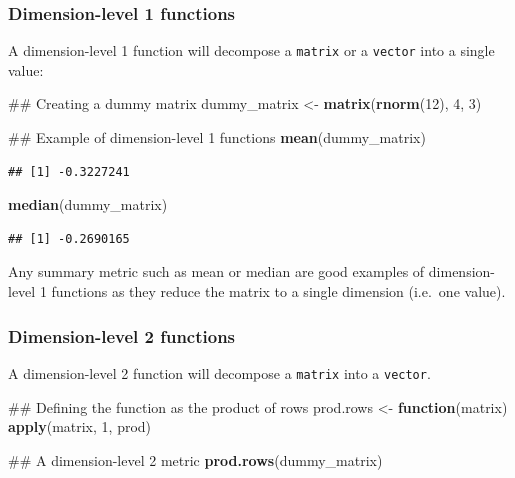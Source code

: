 \documentclass[]{book}
\newenvironment{Shaded}{\begin{snugshade}}{\end{snugshade}}
\newcommand{\KeywordTok}[1]{\textcolor[rgb]{0.13,0.29,0.53}{\textbf{#1}}}
\newcommand{\DecValTok}[1]{\textcolor[rgb]{0.00,0.00,0.81}{#1}}
\newcommand{\StringTok}[1]{\textcolor[rgb]{0.31,0.60,0.02}{#1}}
\newcommand{\ControlFlowTok}[1]{\textcolor[rgb]{0.13,0.29,0.53}{\textbf{#1}}}
\newcommand{\NormalTok}[1]{#1}
\theoremstyle{definition}
\theoremstyle{definition}
\theoremstyle{remark}
\begin{document}
\subsubsection{Dimension-level 1
functions}\label{dimension-level-1-functions}

A dimension-level 1 function will decompose a \texttt{matrix} or a
\texttt{vector} into a single value:

\begin{Shaded}
\begin{Highlighting}[]
\NormalTok{## Creating a dummy matrix}
\NormalTok{dummy_matrix <-}\StringTok{ }\KeywordTok{matrix}\NormalTok{(}\KeywordTok{rnorm}\NormalTok{(}\DecValTok{12}\NormalTok{), }\DecValTok{4}\NormalTok{, }\DecValTok{3}\NormalTok{)}

\NormalTok{## Example of dimension-level 1 functions}
\KeywordTok{mean}\NormalTok{(dummy_matrix)}
\end{Highlighting}
\end{Shaded}

\begin{verbatim}
## [1] -0.3227241
\end{verbatim}

\begin{Shaded}
\begin{Highlighting}[]
\KeywordTok{median}\NormalTok{(dummy_matrix)}
\end{Highlighting}
\end{Shaded}

\begin{verbatim}
## [1] -0.2690165
\end{verbatim}

Any summary metric such as mean or median are good examples of
dimension-level 1 functions as they reduce the matrix to a single
dimension (i.e.~one value).

\subsubsection{Dimension-level 2
functions}\label{dimension-level-2-functions}

A dimension-level 2 function will decompose a \texttt{matrix} into a
\texttt{vector}.

\begin{Shaded}
\begin{Highlighting}[]
\NormalTok{## Defining the function as the product of rows}
\NormalTok{prod.rows <-}\StringTok{ }\ControlFlowTok{function}\NormalTok{(matrix) }\KeywordTok{apply}\NormalTok{(matrix, }\DecValTok{1}\NormalTok{, prod)}

\NormalTok{## A dimension-level 2 metric}
\KeywordTok{prod.rows}\NormalTok{(dummy_matrix)}
\end{Highlighting}
\end{Shaded}
\end{document}
